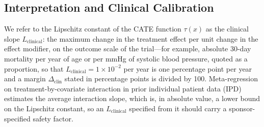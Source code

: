 \documentclass[AMA,Times1COL]{WileyNJDv5}
\begin{document}

\subsection{Interpretation and Clinical Calibration}\label{sec:inference}


We refer to the Lipschitz constant of the CATE function $\tau(x)$ as the clinical slope $L_{\text{clinical}}$: the maximum change in the treatment effect per unit change in the effect modifier, on the outcome scale of the trial---for example, absolute 30-day mortality per year of age or per mmHg of systolic blood pressure, quoted as a proportion, so that $L_{\text{clinical}} = 1 \times 10^{-2}$ per year is one percentage point per year and a margin $\Delta_{\text{clin}}$ stated in percentage points is divided by 100. Meta-regression on treatment-by-covariate interaction in prior individual patient data (IPD) estimates the average interaction slope,\cite{riley2010,fisher2017} which is, in absolute value, a lower bound on the Lipschitz constant, so an $L_{\text{clinical}}$ specified from it should carry a sponsor-specified safety factor.
\end{document}
